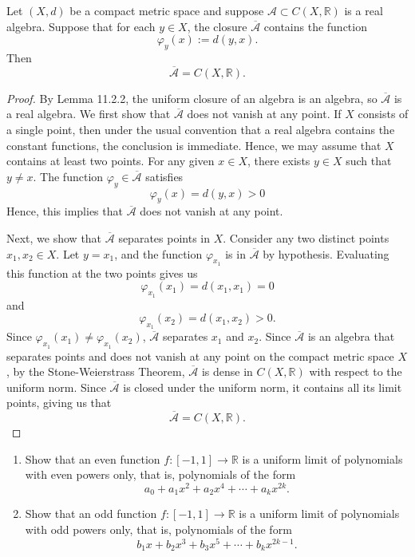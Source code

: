 \begin{problem}
    
    Let \((X,d)\) be a compact metric space and suppose
    \(\mathcal{A}\subset C(X,\mathbb{R})\) is a real algebra. Suppose that for each
    \(y\in X\), the closure \(\overline{\mathcal{A}}\) contains the function
    \[
    \varphi_y(x):=d(y,x).
    \]
    Then
    \[
    \overline{\mathcal{A}}=C(X,\mathbb{R}).
    \]
    
\end{problem}

\begin{proof}

    By Lemma 11.2.2, the uniform closure of an algebra is an algebra, so $\overline{\mathcal A}$ is a real algebra. We first show that $\overline{\mathcal{A}}$ does not vanish at any point. If $X$ consists of a single point, then under the usual convention that a real algebra contains the constant functions, the conclusion is immediate. Hence, we may assume that $X$ contains at least two points. For any given $x \in X$, there exists $y \in X$ such that $y \neq x$. The function $\varphi_y \in \overline{\mathcal{A}}$ satisfies 
    \[
    \varphi_y(x) = d(y,x) > 0
    \]
    Hence, this implies that $\overline{\mathcal{A}}$ does not vanish at any point.

    Next, we show that $\overline{\mathcal{A}}$ separates points in $X$. Consider any two distinct points $x_1 ,x_2 \in X$. Let $y = x_1$, and the function $\varphi_{x_1}$ is in $\overline{\mathcal{A}}$ by hypothesis. Evaluating this function at the two points gives us 
    \[
    \varphi_{x_1}(x_1) = d(x_1, x_1) = 0
    \]
    and 
    \[
    \varphi_{x_1}(x_2) = d(x_1, x_2) > 0.
    \]
    Since $\varphi_{x_1}(x_1) \neq \varphi_{x_1}(x_2)$, $\overline{\mathcal A}$ separates $x_1$ and $x_2$. Since $\overline{\mathcal{A}}$ is an algebra that separates points and does not vanish at any point on the compact metric space $X$, by the Stone-Weierstrass Theorem, $\overline{\mathcal{A}}$ is dense in $C(X, \mathbb{R})$ with respect to the uniform norm.  Since $\overline{\mathcal{A}}$ is closed under the uniform norm, it contains all its limit points, giving us that 
    \[
    \overline{\mathcal{A}} = C(X, \mathbb{R}).
    \]
    
\end{proof}

\begin{problem}

    \vphantom{}
    \begin{enumerate}
    \item[(a)] Show that an even function \(f:[-1,1]\to\mathbb{R}\) is a uniform
    limit of polynomials with even powers only, that is, polynomials of the form
    \[
    a_0+a_1x^2+a_2x^4+\cdots+a_kx^{2k}.
    \]
    
    \item[(b)] Show that an odd function \(f:[-1,1]\to\mathbb{R}\) is a uniform
    limit of polynomials with odd powers only, that is, polynomials of the form
    \[
    b_1x+b_2x^3+b_3x^5+\cdots+b_kx^{2k-1}.
    \]
    \end{enumerate}
        
\end{problem}

